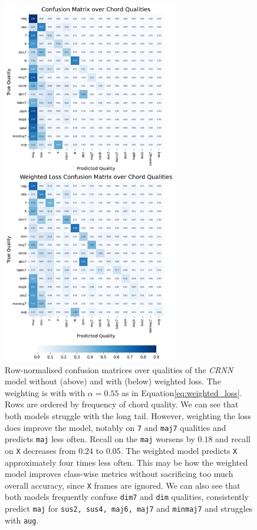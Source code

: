 \begin{figure}[H]
    \centering
    \includegraphics[width=0.68\textwidth]{figures/confusion_matrix_qualities.png}
    \caption{Row-normalised confusion matrices over qualities of the \emph{CRNN} model without (above) and with (below) weighted loss. The weighting is with with $\alpha = 0.55$ as in Equation\ref{eq:weighted_loss}. Rows are ordered by frequency of chord quality. We can see that both models struggle with the long tail. However, weighting the loss does improve the model, notably on \texttt{7} and \texttt{maj7} qualities and predicts \texttt{maj} less often. Recall on the \texttt{maj} worsens by $0.18$ and recall on \texttt{X} decreases from $0.24$ to $0.05$. The weighted model predicts \texttt{X} approximately four times less often. This may be how the weighted model improves class-wise metrics without sacrificing too much overall accuracy, since \texttt{X} frames are ignored. We can also see that both models frequently confuse \texttt{dim7} and \texttt{dim} qualities, consistently predict \texttt{maj} for \texttt{sus2, sus4, maj6, maj7} and \texttt{minmaj7} and struggles with \texttt{aug}.  }\label{fig:crnn_qual_cm}
\end{figure}

